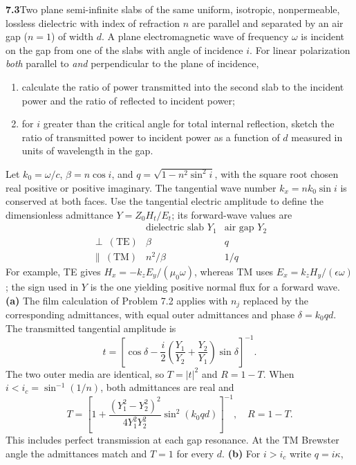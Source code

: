\par\bigskip
\noindent\textbf{7.3}\quad Two plane semi-infinite slabs of the same uniform, isotropic, nonpermeable, lossless dielectric with index of refraction $n$ are parallel and separated by an air gap ($n=1$) of width $d$. A plane electromagnetic wave of frequency $\omega$ is incident on the gap from one of the slabs with angle of incidence $i$. For linear polarization \emph{both} parallel to \emph{and} perpendicular to the plane of incidence,
\begin{enumerate}
\item[(a)] calculate the ratio of power transmitted into the second slab to the incident power and the ratio of reflected to incident power;
\item[(b)] for $i$ greater than the critical angle for total internal reflection, sketch the ratio of transmitted power to incident power as a function of $d$ measured in units of wavelength in the gap.
\end{enumerate}
\solution
Let $k_0=\omega/c$, $\beta=n\cos i$, and
$q=\sqrt{1-n^2\sin^2 i}$, with the square root chosen real positive
or positive imaginary. The tangential wave number
$k_x=nk_0\sin i$ is conserved at both faces. Use the tangential
electric amplitude to define the dimensionless admittance $Y=Z_0H_t/E_t$;
its forward-wave values are
\[
\begin{array}{c|cc}
 &\text{dielectric slab }Y_1&\text{air gap }Y_2\\\hline
\perp\ (\mathrm{TE})&\beta&q\\
\parallel\ (\mathrm{TM})&n^2/\beta&1/q
\end{array}
\]
For example, TE gives $H_x=-k_zE_y/(\mu_0\omega)$, whereas TM
uses $E_x=k_zH_y/(\epsilon\omega)$; the sign used in $Y$ is the
one yielding positive normal flux for a forward wave.
\textbf{(a)} The film calculation of Problem 7.2 applies with
$n_j$ replaced by the corresponding admittances, with equal outer
admittances and phase $\delta=k_0qd$. The transmitted tangential
amplitude is
\[
t=\left[\cos\delta-\frac{i}{2}
 \left(\frac{Y_1}{Y_2}+\frac{Y_2}{Y_1}\right)\sin\delta\right]^{-1}.
\]
The two outer media are identical, so $T=|t|^2$ and $R=1-T$.
When $i<i_c=\sin^{-1}(1/n)$, both admittances are real and
\[
\boxed{T=\left[1+\frac{(Y_1^2-Y_2^2)^2}{4Y_1^2Y_2^2}
                              \sin^2(k_0qd)\right]^{-1},\quad R=1-T.}
\]
This includes perfect transmission at each gap resonance. At the
TM Brewster angle the admittances match and $T=1$ for every $d$.
\textbf{(b)} For $i>i_c$ write $q=i\kappa$,
